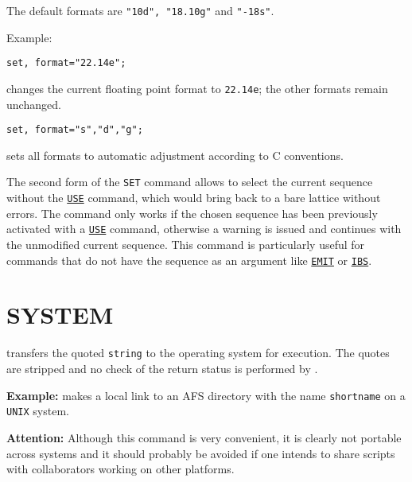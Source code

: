 

The default formats are \texttt{"10d", "18.10g"} and \texttt{"-18s"}.

Example: 
\begin{verbatim}
set, format="22.14e";
\end{verbatim} 
changes the current floating point format to \texttt{22.14e}; the other
formats remain unchanged.  
\begin{verbatim}
set, format="s","d","g";
\end{verbatim} 
sets all formats to automatic adjustment according to C conventions. 

The second form of the \texttt{SET} command allows to select the
current sequence without the \hyperref[sec:use]{\texttt{USE}} command,
which would bring back to a bare lattice without errors. The command
only works 
if the chosen sequence has been previously activated with a
\hyperref[sec:use]{\texttt{USE}} 
command, otherwise a warning is issued and \madx continues with the
unmodified current sequence. This command is particularly useful for
commands that do not have the sequence as an argument like
\hyperref[chap:emit]{\texttt{EMIT}} or \hyperref[chap:ibs]{\texttt{IBS}}. 



\section{SYSTEM}
\label{sec:system}
transfers the quoted \texttt{string} to the operating system for
execution. The quotes are stripped and no check of the return status is
performed by \madx. 

\textbf{Example:} 
makes a local link to an AFS directory with the name \texttt{shortname}
on a \texttt{UNIX} system.  

\textbf{Attention:} Although this command is very convenient, it is
clearly not portable across systems and it should probably be avoided if
one intends to share \madx scripts with collaborators working on other
platforms.  

